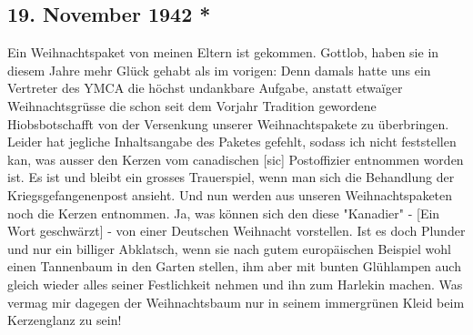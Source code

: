 \subsection{19. November 1942 *}

Ein Weihnachtspaket von meinen Eltern ist gekommen.
Gottlob, haben sie in diesem Jahre mehr Gl\"{u}ck gehabt als im vorigen: Denn damals hatte uns ein Vertreter des YMCA die h\"{o}chst undankbare Aufgabe, anstatt etwaïger Weihnachtsgr\"{u}sse die schon seit dem Vorjahr Tradition gewordene Hiobsbotschafft von der Versenkung unserer Weihnachtspakete zu \"{u}berbringen.
Leider hat jegliche Inhaltsangabe des Paketes gefehlt, sodass ich nicht feststellen kan, was ausser den Kerzen vom canadischen{\color{red} [sic] } Postoffizier entnommen worden ist.
Es ist und bleibt ein grosses Trauerspiel, wenn man sich die Behandlung der Kriegsgefangenenpost ansieht.
Und nun werden aus unseren Weihnachtspaketen noch die Kerzen entnommen.
Ja, was k\"{o}nnen sich den diese "Kanadier" - {\color{red} [Ein Wort geschw\"{a}rzt] } - von einer Deutschen Weihnacht vorstellen.
Ist es doch Plunder und nur ein billiger Abklatsch, wenn sie nach gutem europ\"{a}ischen Beispiel wohl einen Tannenbaum in den Garten stellen, ihm aber mit bunten Gl\"{u}hlampen auch gleich wieder alles seiner Festlichkeit nehmen und ihn zum Harlekin machen.
Was vermag mir dagegen der Weihnachtsbaum nur in seinem immergr\"{u}nen Kleid beim Kerzenglanz zu sein!

\clearpage
